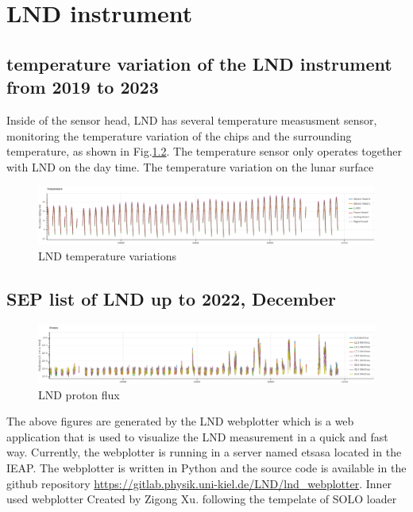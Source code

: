 \chapter{LND instrument }
\label{chp:GCS_Python}

\section{temperature variation of the LND instrument from 2019 to 2023}

Inside of the sensor head, LND has several temperature measusment sensor, monitoring the temperature variation of the chips and the surrounding temperature, as shown in Fig.\ref{}. The temperature sensor only operates together with LND on the day time. 
The temperature variation on the lunar surface

\begin{figure}
    \centering
    \includegraphics{images/lnd_temperature.png}
    \caption{LND temperature variations}
    \label{}
\end{figure}


\section{SEP list of LND up to 2022, December}

\begin{figure}
    \centering
    \includegraphics{images/lnd_proton_flux.png}
    \caption{LND proton flux}
    \label{}
\end{figure}

The above figures are generated by the LND webplotter which is a web application that is used to visualize the LND measurement in a quick and fast way. 
Currently, the webplotter is running in a server named etsasa located in the IEAP.
The webplotter is written in Python and the source code is available in the github repository \url{https://gitlab.physik.uni-kiel.de/LND/lnd_webplotter}. 
Inner used webplotter 
Created by Zigong Xu. following the tempelate of SOLO loader

